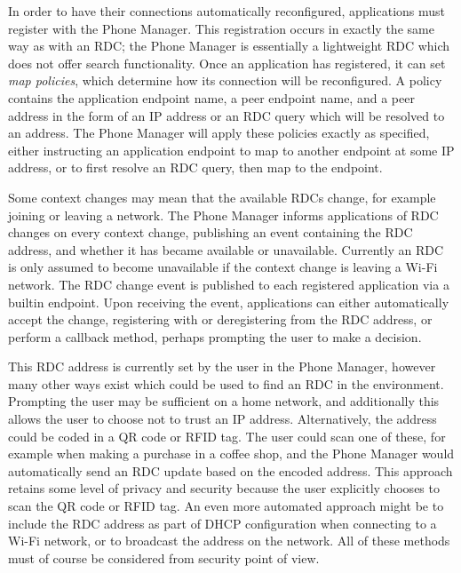 \documentclass[12pt,twoside,notitlepage]{report}
\begin{document}
In order to have their connections automatically reconfigured, applications must register with the Phone Manager. 
This registration occurs in exactly the same way as with an RDC; the Phone Manager is essentially a lightweight RDC which does not offer search functionality. 
Once an application has registered, it can set {\sl map policies}, which determine how its connection will be reconfigured. 
A policy contains the application endpoint name, a peer endpoint name, and a peer address in the form of an IP address or an RDC query which will be resolved to an address. 
The Phone Manager will apply these policies exactly as specified, either instructing an application endpoint to map to another endpoint at some IP address, or to first resolve an RDC query, then map to the endpoint. 

Some context changes may mean that the available RDCs change, for example joining or leaving a network. 
The Phone Manager informs applications of RDC changes on every context change, publishing an event containing the RDC address, and whether it has became available or unavailable. 
Currently an RDC is only assumed to become unavailable if the context change is leaving a Wi-Fi network. 
The RDC change event is published to each registered application via a builtin endpoint. 
Upon receiving the event, applications can either automatically accept the change, registering with or deregistering from the RDC address, or perform a callback method, perhaps prompting the user to make a decision. 

This RDC address is currently set by the user in the Phone Manager, however many other ways exist which could be used to find an RDC in the environment. 
Prompting the user may be sufficient on a home network, and additionally this allows the user to choose not to trust an IP address. 
Alternatively, the address could be coded in a QR code or RFID tag. 
The user could scan one of these, for example when making a purchase in a coffee shop, and the Phone Manager would automatically send an RDC update based on the encoded address. 
This approach retains some level of privacy and security because the user explicitly chooses to scan the QR code or RFID tag. 
An even more automated approach might be to include the RDC address as part of DHCP configuration when connecting to a Wi-Fi network, or to broadcast the address on the network. 
All of these methods must of course be considered from security point of view. 
\end{document}
